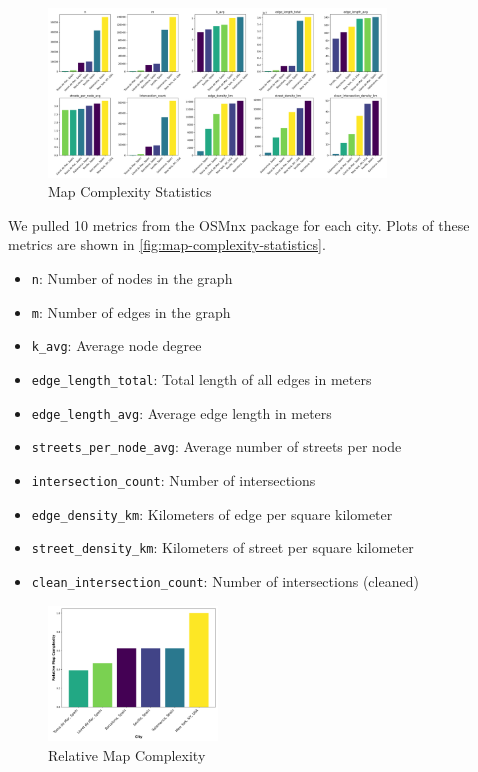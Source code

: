 \begin{figure}[htbp]
    \centering
    \includegraphics[width=0.8\textwidth]{../figures/map_complexity_statistics.png}
    \caption{Map Complexity Statistics}
    \label{fig:map-complexity-statistics}
\end{figure}

We pulled 10 metrics from the OSMnx package\cite{boeing2024osmnx} for each city. Plots of
these metrics are shown in \autoref{fig:map-complexity-statistics}.
\begin{itemize}
    \item \texttt{n}: Number of nodes in the graph
    \item \texttt{m}: Number of edges in the graph  
    \item \texttt{k\_avg}: Average node degree
    \item \texttt{edge\_length\_total}: Total length of all edges in meters
    \item \texttt{edge\_length\_avg}: Average edge length in meters
    \item \texttt{streets\_per\_node\_avg}: Average number of streets per node
    \item \texttt{intersection\_count}: Number of intersections
    \item \texttt{edge\_density\_km}: Kilometers of edge per square kilometer
    \item \texttt{street\_density\_km}: Kilometers of street per square kilometer
    \item \texttt{clean\_intersection\_count}: Number of intersections (cleaned)
\end{itemize}

\begin{figure}[htbp]
    \centering
    \includegraphics[width=0.4\textwidth]{../figures/relative_map_complexity.png}
    \caption{Relative Map Complexity}
    \label{fig:relative-map-complexity}
\end{figure}

